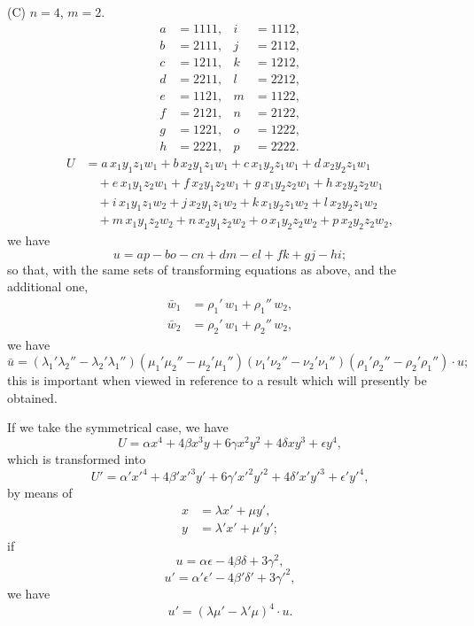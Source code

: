 \documentclass[11pt]{article}
\begin{document}
(C) $n=4$, $m=2$.
\[
\begin{aligned}
a &= 1111, & i &= 1112,\\
b &= 2111, & j &= 2112,\\
c &= 1211, & k &= 1212,\\
d &= 2211, & l &= 2212,\\
e &= 1121, & m &= 1122,\\
f &= 2121, & n &= 2122,\\
g &= 1221, & o &= 1222,\\
h &= 2221, & p &= 2222.
\end{aligned}
\]
\[
\begin{aligned}
U &= a\,x_1 y_1 z_1 w_1 + b\,x_2 y_1 z_1 w_1 + c\,x_1 y_2 z_1 w_1 + d\,x_2 y_2 z_1 w_1\\
&\quad + e\,x_1 y_1 z_2 w_1 + f\,x_2 y_1 z_2 w_1 + g\,x_1 y_2 z_2 w_1 + h\,x_2 y_2 z_2 w_1\\
&\quad + i\,x_1 y_1 z_1 w_2 + j\,x_2 y_1 z_1 w_2 + k\,x_1 y_2 z_1 w_2 + l\,x_2 y_2 z_1 w_2\\
&\quad + m\,x_1 y_1 z_2 w_2 + n\,x_2 y_1 z_2 w_2 + o\,x_1 y_2 z_2 w_2 + p\,x_2 y_2 z_2 w_2,
\end{aligned}
\]
we have
\[
u = ap - bo - cn + dm - el + fk + gj - hi;
\]
so that, with the same sets of transforming equations as above, and the additional one,
\[
\begin{aligned}
\bar{w}_1 &= \rho_1'\,w_1 + \rho_1''\,w_2,\\
\bar{w}_2 &= \rho_2'\,w_1 + \rho_2''\,w_2,
\end{aligned}
\]
we have
\[
\bar{u} = (\lambda_1'\lambda_2'' - \lambda_2'\lambda_1'')(\mu_1'\mu_2'' - \mu_2'\mu_1'')(\nu_1'\nu_2'' - \nu_2'\nu_1'')(\rho_1'\rho_2'' - \rho_2'\rho_1'')\cdot u;
\]
this is important when viewed in reference to a result which will presently be obtained.

If we take the symmetrical case, we have
\[
U = \alpha x^4 + 4\beta x^3 y + 6\gamma x^2 y^2 + 4\delta x y^3 + \epsilon y^4,
\]
which is transformed into
\[
U' = \alpha' x'^4 + 4\beta' x'^3 y' + 6\gamma' x'^2 y'^2 + 4\delta' x' y'^3 + \epsilon' y'^4,
\]
by means of
\[
\begin{aligned}
x &= \lambda x' + \mu y',\\
y &= \lambda' x' + \mu' y';
\end{aligned}
\]
if
\[
u = \alpha\epsilon - 4\beta\delta + 3\gamma^2,
\]
\[
u' = \alpha'\epsilon' - 4\beta'\delta' + 3\gamma'^2,
\]
we have
\[
u' = (\lambda\mu' - \lambda'\mu)^4 \cdot u.
\]
\end{document}
